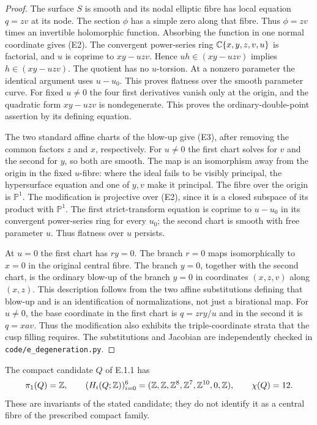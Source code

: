 \begin{proof}
The surface $S$ is smooth and its nodal elliptic fibre has local
equation $q=zv$ at its node. The section $\phi$ has a simple zero
along that fibre. Thus $\phi=zv$ times an invertible holomorphic
function. Absorbing the function in one normal coordinate gives (E2).
The convergent power-series ring $\mathbb C\{x,y,z,v,u\}$ is factorial,
and $u$ is coprime to $xy-uzv$. Hence $uh\in(xy-uzv)$ implies
$h\in(xy-uzv)$. The quotient has no $u$-torsion. At a nonzero
parameter the identical argument uses $u-u_0$. This proves flatness
over the smooth parameter curve.
For fixed $u\ne0$ the four first derivatives vanish only at the
origin, and the quadratic form $xy-uzv$ is nondegenerate. This proves
the ordinary-double-point assertion by its defining equation.

The two standard affine charts of the blow-up give (E3), after
removing the common factors $z$ and $x$, respectively. For $u\ne0$
the first chart solves for $v$ and the second for $y$, so both are
smooth. The map is an isomorphism away from the origin in the fixed
$u$-fibre: where the ideal fails to be visibly principal, the
hypersurface equation and one of $y,v$ make it principal. The fibre
over the origin is $\mathbb P^1$. The modification is projective
over (E2), since it is a closed subspace of its product with
$\mathbb P^1$. The first strict-transform equation is coprime to
$u-u_0$ in its convergent power-series ring for every $u_0$; the
second chart is smooth with free parameter $u$. Thus flatness over
$u$ persists.

At $u=0$ the first chart has $ry=0$. The branch $r=0$ maps
isomorphically to $x=0$ in the original central fibre. The branch
$y=0$, together with the second chart, is the ordinary blow-up of the
branch $y=0$ in coordinates $(x,z,v)$ along $(x,z)$. This description
follows from the two affine substitutions defining that blow-up and
is an identification of normalizations, not just a birational map.
For $u\ne0$, the base coordinate in the first chart is
$q=zry/u$ and in the second it is $q=xav$. Thus the modification also
exhibits the triple-coordinate strata that the cusp filling requires.
The substitutions and Jacobian are independently checked in
\texttt{code/e\_degeneration.py}.
\end{proof}

\begin{proposition}[E.1.4; Proved]\label{st:E.1.4}
The compact candidate $Q$ of E.1.1 has
\[
 \pi_1(Q)=\mathbb Z,\qquad
 (H_i(Q;\mathbb Z))_{i=0}^6
   =(\mathbb Z,\mathbb Z,\mathbb Z^8,\mathbb Z^7,\mathbb Z^{10},0,\mathbb Z),\qquad\chi(Q)=12.
\]
These are invariants of the stated candidate; they do not identify it
as a central fibre of the prescribed compact family.
\end{proposition}


